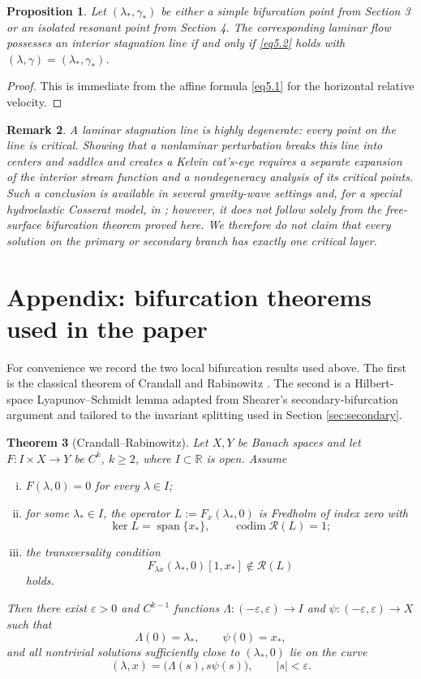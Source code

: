 \documentclass[12pt]{article}
\numberwithin{equation}{section}
\newtheorem{theorem}{Theorem}[section]
\newtheorem{remark}[theorem]{Remark}
\newtheorem{proposition}[theorem]{Proposition}
\numberwithin{equation}{section}
\begin{document}
\begin{proposition}\label{prop5laminar}
Let $(\lambda_*,\gamma_*)$ be either a simple bifurcation point from Section 3 or an isolated resonant point from Section 4. The corresponding laminar flow possesses an interior stagnation line if and only if \eqref{eq5.2} holds with $(\lambda,\gamma)=(\lambda_*,\gamma_*)$.
\end{proposition}

\begin{proof}
This is immediate from the affine formula \eqref{eq5.1} for the horizontal relative velocity.
\end{proof}

\begin{remark}
A laminar stagnation line is highly degenerate: every point on the line is critical. Showing that a nonlaminar perturbation breaks this line into centers and saddles and creates a Kelvin cat's-eye requires a separate expansion of the interior stream function and a nondegeneracy analysis of its critical points. Such a conclusion is available in several gravity-wave settings and, for a special hydroelastic Cosserat model, in \cite{MartinParau2026}; however, it does not follow solely from the free-surface bifurcation theorem proved here. We therefore do not claim that every solution on the primary or secondary branch has exactly one critical layer.
\end{remark}

\section{Appendix: bifurcation theorems used in the paper}
For convenience we record the two local bifurcation results used above. The first is the classical theorem of Crandall and Rabinowitz \cite{CrandallR}. The second is a Hilbert-space Lyapunov--Schmidt lemma adapted from Shearer's secondary-bifurcation argument \cite{Shearer} and tailored to the invariant splitting used in Section \ref{sec:secondary}.

\begin{theorem}[Crandall--Rabinowitz]\label{thm6.1}
Let $X,Y$ be Banach spaces and let $F:I\times X\to Y$ be $C^k$, $k\ge2$, where $I\subset\mathbb R$ is open. Assume
\begin{enumerate}[(i)]
\item $F(\lambda,0)=0$ for every $\lambda\in I$;
\item for some $\lambda_*\in I$, the operator $L:=F_x(\lambda_*,0)$ is Fredholm of index zero with
\[
\ker L=\operatorname{span}\{x_*\},\qquad \operatorname{codim}\mathcal R(L)=1;
\]
\item the transversality condition
\[
F_{\lambda x}(\lambda_*,0)[1,x_*]\notin\mathcal R(L)
\]
holds.
\end{enumerate}
Then there exist $\varepsilon>0$ and $C^{k-1}$ functions $\Lambda:(-\varepsilon,\varepsilon)\to I$ and $\psi:(-\varepsilon,\varepsilon)\to X$ such that
\[
\Lambda(0)=\lambda_*,\qquad \psi(0)=x_*,
\]
and all nontrivial solutions sufficiently close to $(\lambda_*,0)$ lie on the curve
\[
(\lambda,x)=\bigl(\Lambda(s),s\psi(s)\bigr),\qquad |s|<\varepsilon.
\]
\end{theorem}
\end{document}
